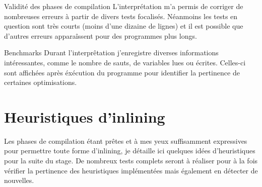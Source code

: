 \documentclass{beamer}
\begin{document}
\begin{frame}{Validité des phases de compilation}
    L'interprétation m'a permis de corriger de nombreuses erreurs à partir de divers tests focalisés. Néanmoins les tests en question sont très courts (moins d'une dizaine de lignes) et il est possible que d'autres erreurs apparaîssent pour des programmes plus longs.
\end{frame}

\begin{frame}{Benchmarks}
    Durant l'interprêtation j'enregistre diverses informations intéressantes, comme le nombre de sauts, de variables lues ou écrites. Celles-ci sont affichées après éxécution du programme pour identifier la pertinence de certaines optimisations.
\end{frame}

\section{Heuristiques d'inlining}

Les phases de compilation étant prêtes et à mes yeux suffisamment expressives pour permettre toute forme d'inlining, je détaille ici quelques idées d'heuristiques pour la suite du stage. De nombreux tests complets seront à réaliser pour à la fois vérifier la pertinence des heuristiques implémentées mais également en détecter de nouvelles.
\end{document}
